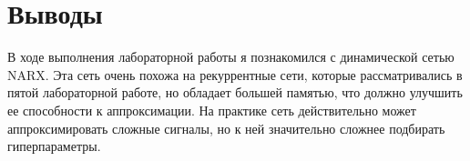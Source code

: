 \section{Выводы}
В ходе выполнения лабораторной работы я познакомился с динамической сетью NARX. Эта сеть очень похожа на рекуррентные сети, которые рассматривались в пятой лабораторной работе, но обладает большей памятью, что должно улучшить ее способности к аппроксимации. На практике сеть действительно может аппроксимировать сложные сигналы, но к ней значительно сложнее подбирать гиперпараметры.
\pagebreak

